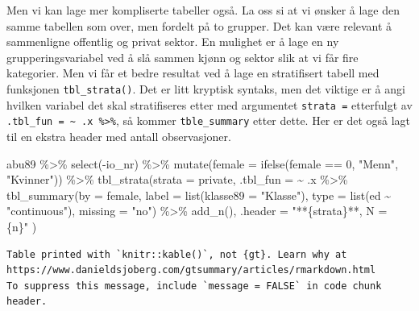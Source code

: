\documentclass[
  letterpaper,
  DIV=11,
  numbers=noendperiod]{scrreprt}
\newenvironment{Shaded}{\begin{snugshade}}{\end{snugshade}}
\newcommand{\AttributeTok}[1]{\textcolor[rgb]{0.40,0.45,0.13}{#1}}
\newcommand{\DecValTok}[1]{\textcolor[rgb]{0.68,0.00,0.00}{#1}}
\newcommand{\FunctionTok}[1]{\textcolor[rgb]{0.28,0.35,0.67}{#1}}
\newcommand{\NormalTok}[1]{\textcolor[rgb]{0.00,0.23,0.31}{#1}}
\newcommand{\SpecialCharTok}[1]{\textcolor[rgb]{0.37,0.37,0.37}{#1}}
\newcommand{\StringTok}[1]{\textcolor[rgb]{0.13,0.47,0.30}{#1}}
\theoremstyle{definition}
\theoremstyle{remark}
\begin{document}
Men vi kan lage mer kompliserte tabeller også. La oss si at vi ønsker å
lage den samme tabellen som over, men fordelt på to grupper. Det kan
være relevant å sammenligne offentlig og privat sektor. En mulighet er å
lage en ny grupperingsvariabel ved å slå sammen kjønn og sektor slik at
vi får fire kategorier. Men vi får et bedre resultat ved å lage en
stratifisert tabell med funksjonen \texttt{tbl\_strata()}. Det er litt
kryptisk syntaks, men det viktige er å angi hvilken variabel det skal
stratifiseres etter med argumentet \texttt{strata\ =} etterfulgt av
\texttt{.tbl\_fun\ =\ \textasciitilde{}\ .x\ \%\textgreater{}\%}, så
kommer \texttt{tble\_summary} etter dette. Her er det også lagt til en
ekstra header med antall observasjoner.

\begin{Shaded}
\begin{Highlighting}[]
\NormalTok{abu89 }\SpecialCharTok{\%\textgreater{}\%} 
  \FunctionTok{select}\NormalTok{(}\SpecialCharTok{{-}}\NormalTok{io\_nr) }\SpecialCharTok{\%\textgreater{}\%} 
  \FunctionTok{mutate}\NormalTok{(}\AttributeTok{female =} \FunctionTok{ifelse}\NormalTok{(female }\SpecialCharTok{==} \DecValTok{0}\NormalTok{, }\StringTok{"Menn"}\NormalTok{, }\StringTok{"Kvinner"}\NormalTok{)) }\SpecialCharTok{\%\textgreater{}\%} 
  \FunctionTok{tbl\_strata}\NormalTok{(}\AttributeTok{strata =}\NormalTok{ private, }
             \AttributeTok{.tbl\_fun =} 
               \SpecialCharTok{\textasciitilde{}}\NormalTok{ .x }\SpecialCharTok{\%\textgreater{}\%}
               \FunctionTok{tbl\_summary}\NormalTok{(}\AttributeTok{by =}\NormalTok{ female, }
              \AttributeTok{label =} \FunctionTok{list}\NormalTok{(}\AttributeTok{klasse89 =} \StringTok{"Klasse"}\NormalTok{), }
              \AttributeTok{type =} \FunctionTok{list}\NormalTok{(ed }\SpecialCharTok{\textasciitilde{}} \StringTok{"continuous"}\NormalTok{), }
              \AttributeTok{missing =} \StringTok{"no"}\NormalTok{) }\SpecialCharTok{\%\textgreater{}\%}
               \FunctionTok{add\_n}\NormalTok{(),}
    \AttributeTok{.header =} \StringTok{"**\{strata\}**, N = \{n\}"}
\NormalTok{    )}
\end{Highlighting}
\end{Shaded}

\begin{verbatim}
Table printed with `knitr::kable()`, not {gt}. Learn why at
https://www.danieldsjoberg.com/gtsummary/articles/rmarkdown.html
To suppress this message, include `message = FALSE` in code chunk header.
\end{verbatim}
\end{document}

